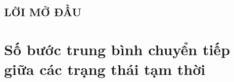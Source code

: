 \documentclass[14pt, a4paper]{article}
\numberwithin{equation}{section}
\numberwithin{figure}{section}
\theoremstyle{sltheorem}
\theoremstyle{soltheorem}
\numberwithin{dl}{section}
\numberwithin{md}{section}
\numberwithin{vd}{section}
\begin{document}
\begin{titlepage}





        \vfill %

    \end{titlepage}

    \cleardoublepage
    \tableofcontents
    \newpage
    \listoffigures
    \newpage
    \glsaddall 
    \renewcommand*{\glossaryname}{Danh mục các từ viết tắt}
    \renewcommand*{\acronymname}{Danh sách từ viết tắt}
    \renewcommand*{\entryname}{Viết tắt}
    \renewcommand*{\descriptionname}{Viết đầy đủ}
    \printnoidxglossary
    \cleardoublepage


    \newpage

    \nocite{*}

    \begin{center}
    \section*{LỜI MỞ ĐẦU}
    \end{center}

    \newpage

    \section{Số bước trung bình chuyển tiếp giữa các trạng thái tạm thời}
\end{document}
